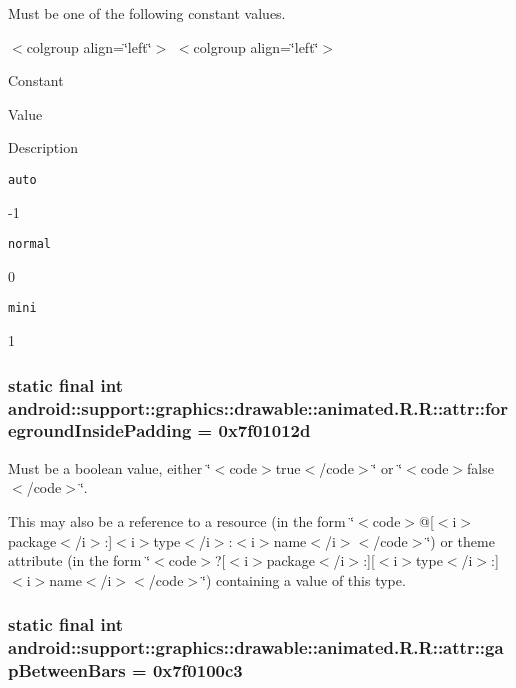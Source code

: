 Must be one of the following constant values. \begin{TabularC}{0}
\hline
\end{TabularC}
$<$colgroup align=\char`\"{}left\char`\"{}$>$ $<$colgroup align=\char`\"{}left\char`\"{}$>$ 

Constant

Value

Description 

{\tt auto}

-1

{\tt normal}

0

{\tt mini}

1\hypertarget{classandroid_1_1support_1_1graphics_1_1drawable_1_1animated_1_1_r_1_1attr_716d491a87081a21f76b8d52324200c6}{
\subsubsection[{foregroundInsidePadding}]{\setlength{\rightskip}{0pt plus 5cm}static final int android::support::graphics::drawable::animated.R.R::attr::foregroundInsidePadding = 0x7f01012d}}
\label{classandroid_1_1support_1_1graphics_1_1drawable_1_1animated_1_1_r_1_1attr_716d491a87081a21f76b8d52324200c6}


Must be a boolean value, either \char`\"{}$<$code$>$true$<$/code$>$\char`\"{} or \char`\"{}$<$code$>$false$<$/code$>$\char`\"{}. 

This may also be a reference to a resource (in the form \char`\"{}$<$code$>$@\mbox{[}$<$i$>$package$<$/i$>$:\mbox{]}$<$i$>$type$<$/i$>$:$<$i$>$name$<$/i$>$$<$/code$>$\char`\"{}) or theme attribute (in the form \char`\"{}$<$code$>$?\mbox{[}$<$i$>$package$<$/i$>$:\mbox{]}\mbox{[}$<$i$>$type$<$/i$>$:\mbox{]}$<$i$>$name$<$/i$>$$<$/code$>$\char`\"{}) containing a value of this type. \hypertarget{classandroid_1_1support_1_1graphics_1_1drawable_1_1animated_1_1_r_1_1attr_3f99d6b05fc1f5987f483ad212cb3b76}{
\subsubsection[{gapBetweenBars}]{\setlength{\rightskip}{0pt plus 5cm}static final int android::support::graphics::drawable::animated.R.R::attr::gapBetweenBars = 0x7f0100c3}}
\label{classandroid_1_1support_1_1graphics_1_1drawable_1_1animated_1_1_r_1_1attr_3f99d6b05fc1f5987f483ad212cb3b76}


